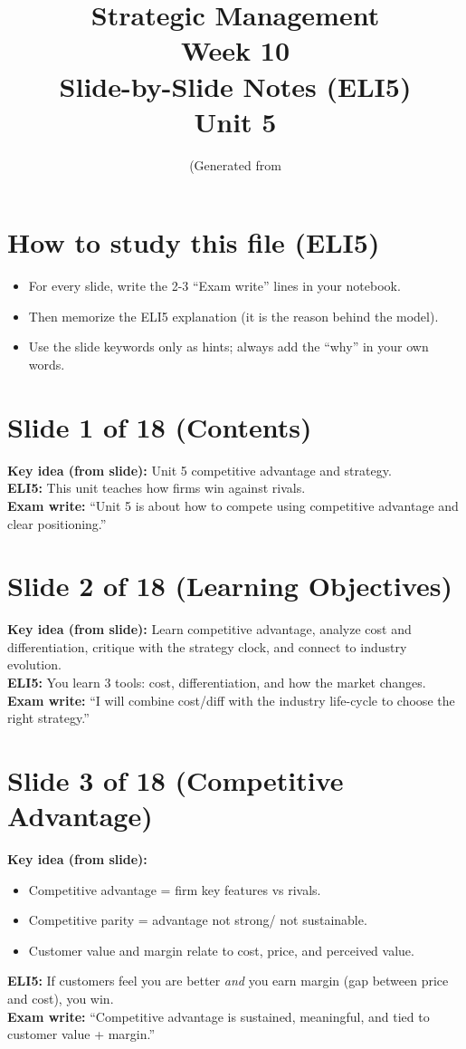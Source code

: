 \documentclass[11pt,a4paper]{article}
\title{Strategic Management \\ Week 10 \\ Slide-by-Slide Notes (ELI5) \\ Unit 5}
\author{(Generated from }sm-week-10-slides-1.pdf\text{)}
\date{}
\begin{document}
\maketitle

\section*{How to study this file (ELI5)}
\begin{itemize}
  \item For every slide, write the 2-3 ``Exam write'' lines in your notebook.
  \item Then memorize the ELI5 explanation (it is the reason behind the model).
  \item Use the slide keywords only as hints; always add the ``why'' in your own words.
\end{itemize}

\section*{Slide 1 of 18 (Contents)}
\textbf{Key idea (from slide):} Unit 5 competitive advantage and strategy.\\
\textbf{ELI5:} This unit teaches how firms win against rivals.\\
\textbf{Exam write:} ``Unit 5 is about how to compete using competitive advantage and clear positioning.''

\section*{Slide 2 of 18 (Learning Objectives)}
\textbf{Key idea (from slide):} Learn competitive advantage, analyze cost and differentiation, critique with the strategy clock, and connect to industry evolution.\\
\textbf{ELI5:} You learn 3 tools: cost, differentiation, and how the market changes.\\
\textbf{Exam write:} ``I will combine cost/diff with the industry life-cycle to choose the right strategy.''

\section*{Slide 3 of 18 (Competitive Advantage)}
\textbf{Key idea (from slide):}
\begin{itemize}
  \item Competitive advantage = firm key features vs rivals.
  \item Competitive parity = advantage not strong/ not sustainable.
  \item Customer value and margin relate to cost, price, and perceived value.
\end{itemize}
\textbf{ELI5:} If customers feel you are better \emph{and} you earn margin (gap between price and cost), you win.\\
\textbf{Exam write:} ``Competitive advantage is sustained, meaningful, and tied to customer value + margin.''
\end{document}
